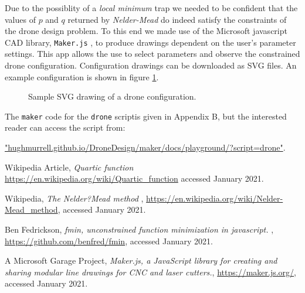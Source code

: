 \documentclass[11pt]{article}
\begin{document}
Due to the possiblity of a {\em local minimum} trap we needed to be confident that the
values of $p$ and $q$ returned by {\em Nelder-Mead} do indeed satisfy the constraints
of the drone design problem. To this end we made use of the Microsoft javascript CAD library,
{\tt Maker.js} \cite{maker}, to produce drawings dependent on the user's parameter settings. 
This app allows the use to select parameters and observe the constrained drone configuration.
Configuration drawings can be downloaded as SVG files.
An example configuration is shown in figure \ref{fig3}.

\begin{figure}[H]
\begin{center}
\end{center}
\caption{Sample SVG drawing of a drone configuration.}  
\label{fig3}
\end{figure}

The {\tt maker} code for the {\tt drone} scriptis given in Appendix B, but the interested reader
can access the script from:

\small
\url{"hughmurrell.github.io/DroneDesign/maker/docs/playground/?script=drone"}.
\normalsize


\begin{thebibliography}{99}


 Wikipedia Article,
{\em Quartic function} 
\url{https://en.wikipedia.org/wiki/Quartic_function}
accessed January 2021.

 Wikipedia,
{\em The Nelder?Mead method },
\url{https://en.wikipedia.org/wiki/Nelder-Mead_method},
accessed January 2021.

 Ben Fedrickson,
{\em fmin, unconstrained function minimization in javascript.  },
\url{https://github.com/benfred/fmin},
accessed January 2021.

 A Microsoft Garage Project,
{\em Maker.js, a JavaScript library for creating and sharing modular line drawings for CNC and laser cutters.},
\url{https://maker.js.org/},
accessed January 2021.

\end{thebibliography}
\end{document}
